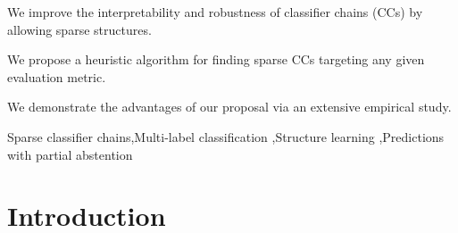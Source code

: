 \documentclass[a4paper,fleqn]{cas-sc}
\begin{document}
\fntext[1]{}


\begin{abstract}
Classifier chains and their ensembles have been shown to be accurate in multi-label classification (MLC). This paper is an attempt to improve the interpretability and robustness of classifier chains by allowing sparse structures, instead of the dense structures enforced by the standard classifier chains. Technically, we propose a heuristic algorithm for finding sparse classifier chains targeting any given evaluation metric. We then conduct an extensive empirical study to demonstrate the potential advantages of our proposal in the standard MLC setting and MLC with partial abstention, where the classifiers are allowed to abstain from making precise predictions on uncertain labels.
\end{abstract}


\begin{highlights}
\item We improve the interpretability and robustness of classifier chains (CCs) by allowing sparse structures.
\item We propose a heuristic algorithm for finding sparse CCs targeting any given evaluation metric.
\item We demonstrate the advantages of our proposal via an extensive empirical study.
\end{highlights}


\begin{keywords}
Sparse classifier chains\sep Multi-label classification \sep Structure learning \sep Predictions with partial abstention 
\end{keywords}

\maketitle

\section{Introduction}\label{sec:Introduction}
\end{document}
